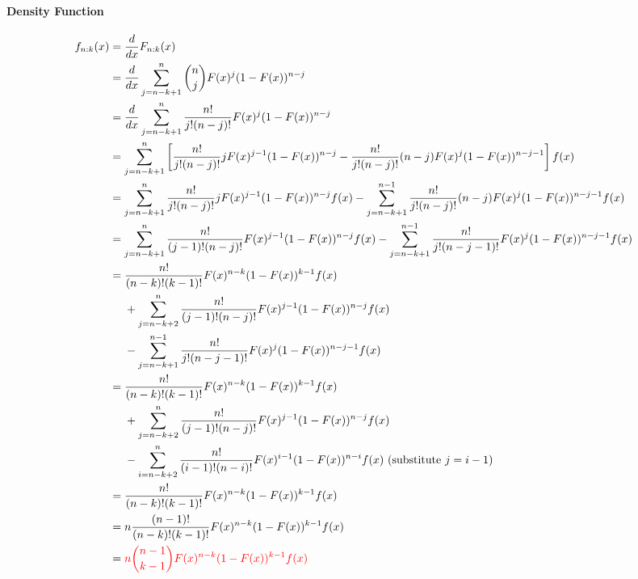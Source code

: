 \documentclass{book}
\begin{document}
	\paragraph{Density Function}
	\begin{align}
		f_{n:k}(x)
		&= \frac{d}{dx} F_{n:k}(x) \\
		&= \frac{d}{dx} \sum_{j=n-k+1}^n \binom{n}{j} F(x)^j (1 - F(x))^{n-j} \\
		&= \frac{d}{dx} \sum_{j=n-k+1}^n \frac{n!}{j!(n-j)!} F(x)^j (1 - F(x))^{n-j} \\
		&= \sum_{j=n-k+1}^n \left[
		\frac{n!}{j!(n-j)!} j F(x)^{j-1} (1 - F(x))^{n-j}
		- \frac{n!}{j!(n-j)!} (n-j) F(x)^j (1 - F(x))^{n-j-1}
		\right]f(x)\\
		&= \sum_{j=n-k+1}^n 
		\frac{n!}{j!(n-j)!} j F(x)^{j-1} (1 - F(x))^{n-j} f(x)
		- \sum_{j=n-k+1}^{n-1} 
		\frac{n!}{j!(n-j)!} (n-j) F(x)^j (1 - F(x))^{n-j-1} f(x)\\
		&= \sum_{j=n-k+1}^n
		\frac{n!}{(j-1)!(n-j)!} F(x)^{j-1} (1 - F(x))^{n-j} f(x)
		- \sum_{j=n-k+1}^{n-1}
		\frac{n!}{j!(n-j-1)!} F(x)^j (1 - F(x))^{n-j-1} f(x) \\
		&=\begin{aligned}[t]
			&\frac{n!}{(n-k)!(k-1)!} F(x)^{n-k} (1 - F(x))^{k-1} f(x) \\
			&+ \sum_{j=n-k+2}^n
			\frac{n!}{(j-1)!(n-j)!} F(x)^{j-1} (1 - F(x))^{n-j} f(x) \\
			&- \sum_{j=n-k+1}^{n-1}
			\frac{n!}{j!(n-j-1)!} F(x)^j (1 - F(x))^{n-j-1} f(x)
		\end{aligned} \\
		&=\begin{aligned}[t]
			&\frac{n!}{(n-k)!(k-1)!} F(x)^{n-k} (1 - F(x))^{k-1} f(x) \\
			&+ \sum_{j=n-k+2}^n
			\frac{n!}{(j-1)!(n-j)!} F(x)^{j-1} (1 - F(x))^{n-j} f(x) \\
			&- \sum_{i=n-k+2}^{n}
			\frac{n!}{(i-1)!(n-i)!} F(x)^{i-1} (1 - F(x))^{n-i} f(x) \text{ (substitute $j = i - 1$)}
		\end{aligned} \\
		&= \frac{n!}{(n-k)!(k-1)!} F(x)^{n-k} (1 - F(x))^{k-1} f(x) \\
		&= n \frac{(n-1)!}{(n-k)!(k-1)!} F(x)^{n-k} (1 - F(x))^{k-1} f(x) \\
		&= \textcolor{red}{
		n \binom{n-1}{k-1} F(x)^{n-k} (1 - F(x))^{k-1} f(x)
		}
	\end{align}
\end{document}
